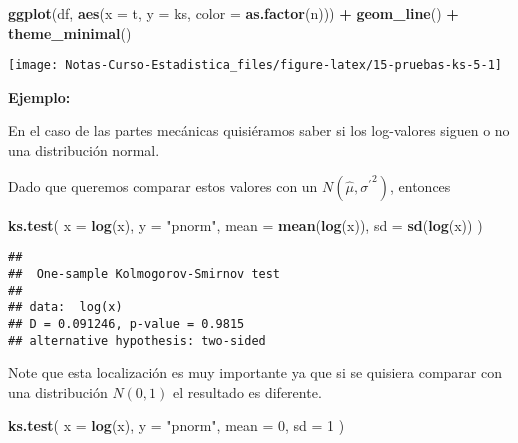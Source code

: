 \documentclass[
  12pt,
]{book}
\newenvironment{Shaded}{\begin{snugshade}}{\end{snugshade}}
\newcommand{\DataTypeTok}[1]{\textcolor[rgb]{0.13,0.29,0.53}{#1}}
\newcommand{\DecValTok}[1]{\textcolor[rgb]{0.00,0.00,0.81}{#1}}
\newcommand{\KeywordTok}[1]{\textcolor[rgb]{0.13,0.29,0.53}{\textbf{#1}}}
\newcommand{\NormalTok}[1]{#1}
\newcommand{\OperatorTok}[1]{\textcolor[rgb]{0.81,0.36,0.00}{\textbf{#1}}}
\newcommand{\StringTok}[1]{\textcolor[rgb]{0.31,0.60,0.02}{#1}}
\begin{document}
\begin{Shaded}
\begin{Highlighting}[]
\KeywordTok{ggplot}\NormalTok{(df, }\KeywordTok{aes}\NormalTok{(}\DataTypeTok{x =}\NormalTok{ t, }\DataTypeTok{y =}\NormalTok{ ks, }\DataTypeTok{color =} \KeywordTok{as.factor}\NormalTok{(n))) }\OperatorTok{+}
\StringTok{  }\KeywordTok{geom\_line}\NormalTok{() }\OperatorTok{+}
\StringTok{  }\KeywordTok{theme\_minimal}\NormalTok{()}
\end{Highlighting}
\end{Shaded}

\begin{center}\texttt{[image: Notas-Curso-Estadistica\_files/figure-latex/15-pruebas-ks-5-1]} \end{center}

\textbf{Ejemplo:}

En el caso de las partes mecánicas quisiéramos saber si los log-valores siguen o
no una distribución normal.

Dado que queremos comparar estos valores con un
\(N (\hat{\mu } , {\sigma^{'}}^{2})\), entonces

\begin{Shaded}
\begin{Highlighting}[]
\KeywordTok{ks.test}\NormalTok{(}
  \DataTypeTok{x =} \KeywordTok{log}\NormalTok{(x),}
  \DataTypeTok{y =} \StringTok{"pnorm"}\NormalTok{,}
  \DataTypeTok{mean =} \KeywordTok{mean}\NormalTok{(}\KeywordTok{log}\NormalTok{(x)),}
  \DataTypeTok{sd =} \KeywordTok{sd}\NormalTok{(}\KeywordTok{log}\NormalTok{(x))}
\NormalTok{)}
\end{Highlighting}
\end{Shaded}

\begin{verbatim}
## 
##  One-sample Kolmogorov-Smirnov test
## 
## data:  log(x)
## D = 0.091246, p-value = 0.9815
## alternative hypothesis: two-sided
\end{verbatim}

Note que esta localización es muy importante ya que si se quisiera comparar con
una distribución \(N(0,1)\) el resultado es diferente.

\begin{Shaded}
\begin{Highlighting}[]
\KeywordTok{ks.test}\NormalTok{(}
  \DataTypeTok{x =} \KeywordTok{log}\NormalTok{(x),}
  \DataTypeTok{y =} \StringTok{"pnorm"}\NormalTok{,}
  \DataTypeTok{mean =} \DecValTok{0}\NormalTok{,}
  \DataTypeTok{sd =} \DecValTok{1}
\NormalTok{)}
\end{Highlighting}
\end{Shaded}
\end{document}
